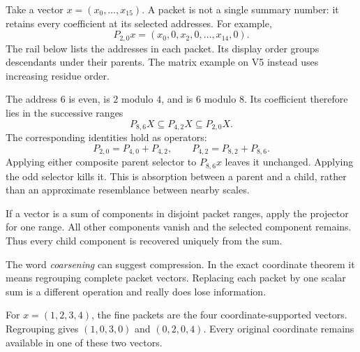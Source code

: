 Take a vector $x=(x_0,\ldots,x_{15})$. A packet is not a single summary number: it retains every coefficient at its selected addresses. For example,
\[
P_{2,0}x=(x_0,0,x_2,0,\ldots,x_{14},0).
\]
The rail below lists the addresses in each packet. Its display order groups descendants under their parents. The matrix example on V5 instead uses increasing residue order.


The address $6$ is even, is $2$ modulo $4$, and is $6$ modulo $8$. Its coefficient therefore lies in the successive ranges
\[
P_{8,6}X\subseteq P_{4,2}X\subseteq P_{2,0}X.
\]
The corresponding identities hold as operators:
\[
P_{2,0}=P_{4,0}+P_{4,2},\qquad
P_{4,2}=P_{8,2}+P_{8,6}.
\]
Applying either composite parent selector to $P_{8,6}x$ leaves it unchanged. Applying the odd selector kills it. This is absorption between a parent and a child, rather than an approximate resemblance between nearby scales.

If a vector is a sum of components in disjoint packet ranges, apply the projector for one range. All other components vanish and the selected component remains. Thus every child component is recovered uniquely from the sum.


The word \emph{coarsening} can suggest compression. In the exact coordinate theorem it means regrouping complete packet vectors. Replacing each packet by one scalar sum is a different operation and really does lose information.

For $x=(1,2,3,4)$, the fine packets are the four coordinate-supported vectors. Regrouping gives $(1,0,3,0)$ and $(0,2,0,4)$. Every original coordinate remains available in one of these two vectors.


